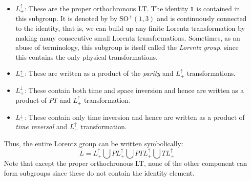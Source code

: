 \begin{itemize}
    \item $L^{\uparrow}_{+}$: These are the proper orthochronous LT. The identity $\mathds{1}$ is contained in this subgroup. It is denoted by by $\mathrm{SO}^+(1,3)$ and is continuously connected to the identity, that is, we can build up any
finite Lorentz transformation by making many consecutive small Lorentz transformations. Sometimes, as an abuse of terminology, this subgroup is itself called the \textit{Lorentz group}, since this contains the only physical transformations. 
      \item $L^{\uparrow}_{-}$: These are written as a product of the \textit{parity} and $L^{\uparrow}_{+}$ transformations.
    \item $L^{\downarrow}_{+}$: These contain both time and space inversion and hence are written as a product of $PT$ and $L^{\uparrow}_{+}$ transformation.
    \item $L^{\downarrow}_{-}$: These contain only time inversion and hence are written as a product of \textit{time reversal } and $L^{\uparrow}_{+}$ transformation. 
\end{itemize} 
Thus, the entire Lorentz group can be written symbolically:
$$L = L^{\uparrow}_{+} \bigcup PL^{\uparrow}_{+} \bigcup PT L^{\uparrow}_{+} \bigcup TL^{\uparrow}_{+}$$
Note that except the proper orthochronous LT, none of the other component can form subgroups since these do not contain the identity element.
